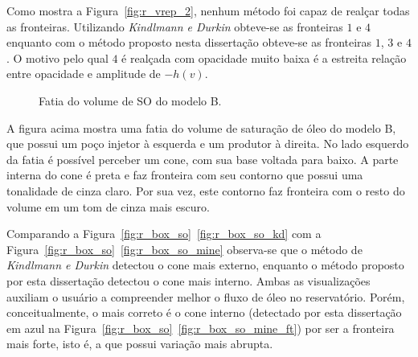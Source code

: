 	Como mostra a Figura~\ref{fig:r_vrep_2}, nenhum método foi capaz de realçar todas as fronteiras. Utilizando \textit{Kindlmann e Durkin} obteve-se as fronteiras $ 1 $ e $ 4 $ enquanto com o método proposto nesta dissertação obteve-se as fronteiras $ 1 $, $ 3 $ e $ 4 $. O motivo pelo qual $ 4 $ é realçada com opacidade muito baixa é a estreita relação entre opacidade e amplitude de $ -h(v) $.
	
\begin{figure}[h]
	\centering
	\caption{Fatia do volume de SO do modelo B.}
\end{figure}

	A figura acima mostra uma fatia do volume de saturação de óleo do modelo B, que possui um poço injetor à esquerda e um produtor à direita. No lado esquerdo da fatia é possível perceber um cone, com sua base voltada para baixo. A parte interna do cone é preta e faz fronteira com seu contorno que possui uma tonalidade de cinza claro. Por sua vez, este contorno faz fronteira com o resto do volume em um tom de cinza mais escuro.
	
	Comparando a Figura~\ref{fig:r_box_so}~\ref{fig:r_box_so_kd} com a Figura~\ref{fig:r_box_so}~\ref{fig:r_box_so_mine} observa-se que o método de \textit{Kindlmann e Durkin} detectou o cone mais externo, enquanto o método proposto por esta dissertação detectou o cone mais interno. Ambas as visualizações auxiliam o usuário a compreender melhor o fluxo de óleo no reservatório. Porém, conceitualmente, o mais correto é o cone interno (detectado por esta dissertação em azul na Figura~\ref{fig:r_box_so}~\ref{fig:r_box_so_mine_ft}) por ser a fronteira mais forte, isto é, a que possui variação mais abrupta.

